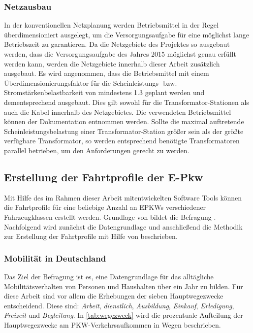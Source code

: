 \subsubsection{Netzausbau}

In der konventionellen Netzplanung werden Betriebsmittel in der Regel überdimensioniert ausgelegt, um die Versorgungsaufgabe für eine möglichst lange Betriebszeit zu garantieren.
Da die Netzgebiete des  Projektes so ausgebaut werden, dass die Versorgungsaufgabe des Jahres \num{2015} möglichst genau erfüllt werden kann, werden die Netzgebiete innerhalb dieser Arbeit zusätzlich ausgebaut.
Es wird angenommen, dass die Betriebsmittel mit einem Überdimensionierungsfaktor für die Scheinleistungs- bzw. Stromstärkenbelastbarkeit von mindestens \num{1.3} geplant werden und dementsprechend ausgebaut.
Dies gilt sowohl für die Transformator-Stationen als auch die Kabel innerhalb des Netzgebietes.
Die verwendeten Betriebsmittel können der Dokumentation  \cite{edisgoDocs2017a} entnommen werden.
Sollte die maximal auftretende Scheinleistungsbelastung einer Transformator-Station größer sein als der größte verfügbare Transformator, so werden entsprechend benötigte Transformatoren parallel betrieben, um den Anforderungen gerecht zu werden.


\subsection{Erstellung der Fahrtprofile der E-Pkw}\label{chap:simbev_theo}

Mit Hilfe des im Rahmen dieser Arbeit mitentwickelten Software Tools  können die Fahrtprofile für eine beliebige Anzahl an \glspl{EPKW} verschiedener Fahrzeugklassen erstellt werden.
Grundlage von  bildet die Befragung  \cite{ISGH2017}.
Nachfolgend wird zunächst die Datengrundlage und anschließend die Methodik zur Erstellung der Fahrtprofile mit Hilfe von  beschrieben.


\subsubsection{Mobilität in Deutschland}\label{chap:MID}

Das Ziel der Befragung  \cite{ISGH2017} ist es, eine Datengrundlage für das alltägliche Mobilitätsverhalten von Personen und Haushalten über ein Jahr zu bilden.
Für diese Arbeit sind vor allem die Erhebungen der sieben Hauptwegezwecke entscheidend.
Diese sind: \textit{Arbeit}, \textit{dienstlich}, \textit{Ausbildung}, \textit{Einkauf}, \textit{Erledigung}, \textit{Freizeit} und \textit{Begleitung}.
In \autoref{tab:wegezweck} wird die prozentuale Aufteilung der Hauptwegezwecke am \gls{PKW}-Verkehrsaufkommen in Wegen beschrieben.

